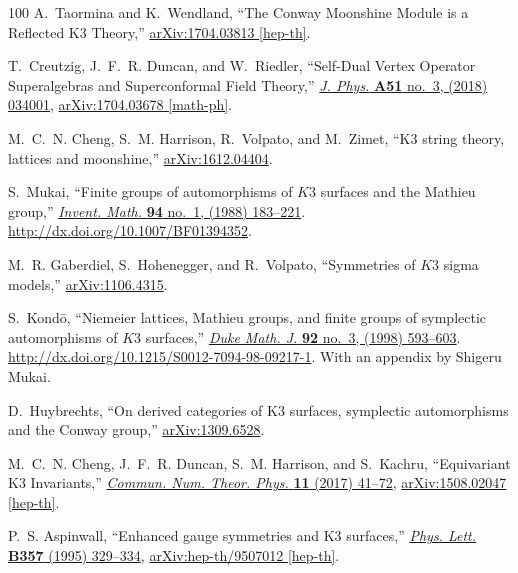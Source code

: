 \begin{thebibliography}{100}
A.~Taormina and K.~Wendland, ``{The Conway Moonshine Module is a Reflected K3
  Theory},''
\href{http://arxiv.org/abs/1704.03813}{{\ttfamily arXiv:1704.03813 [hep-th]}}.

T.~Creutzig, J.~F.~R. Duncan, and W.~Riedler, ``{Self-Dual Vertex Operator
  Superalgebras and Superconformal Field Theory},''
  \href{http://dx.doi.org/10.1088/1751-8121/aa9af5}{{\em J. Phys.} {\bfseries
  A51} no.~3, (2018) 034001},
\href{http://arxiv.org/abs/1704.03678}{{\ttfamily arXiv:1704.03678 [math-ph]}}.

M.~C.~N. Cheng, S.~M. Harrison, R.~Volpato, and M.~Zimet, ``K3 string theory,
  lattices and moonshine,''
  \href{http://arxiv.org/abs/arXiv:1612.04404}{{\ttfamily arXiv:1612.04404}}.

S.~Mukai, ``Finite groups of automorphisms of {$K3$} surfaces and the {M}athieu
  group,'' \href{http://dx.doi.org/10.1007/BF01394352}{{\em Invent. Math.}
  {\bfseries 94} no.~1, (1988) 183--221}.
  \url{http://dx.doi.org/10.1007/BF01394352}.

M.~R. Gaberdiel, S.~Hohenegger, and R.~Volpato, ``{Symmetries of $K3$ sigma
  models},'' \href{http://arxiv.org/abs/arXiv:1106.4315}{{\ttfamily
  arXiv:1106.4315}}.

S.~Kond{\=o}, ``Niemeier lattices, {M}athieu groups, and finite groups of
  symplectic automorphisms of {$K3$} surfaces,''
  \href{http://dx.doi.org/10.1215/S0012-7094-98-09217-1}{{\em Duke Math. J.}
  {\bfseries 92} no.~3, (1998) 593--603}.
  \url{http://dx.doi.org/10.1215/S0012-7094-98-09217-1}. With an appendix by
  Shigeru Mukai.

D.~Huybrechts, ``On derived categories of {K}3 surfaces, symplectic
  automorphisms and the {C}onway group,''
  \href{http://arxiv.org/abs/arXiv:1309.6528}{{\ttfamily arXiv:1309.6528}}.

M.~C.~N. Cheng, J.~F.~R. Duncan, S.~M. Harrison, and S.~Kachru, ``{Equivariant
  K3 Invariants},'' \href{http://dx.doi.org/10.4310/CNTP.2017.v11.n1.a2}{{\em
  Commun. Num. Theor. Phys.} {\bfseries 11} (2017) 41--72},
\href{http://arxiv.org/abs/1508.02047}{{\ttfamily arXiv:1508.02047 [hep-th]}}.

P.~S. Aspinwall, ``{Enhanced gauge symmetries and K3 surfaces},''
  \href{http://dx.doi.org/10.1016/0370-2693(95)00957-M}{{\em Phys. Lett.}
  {\bfseries B357} (1995) 329--334},
\href{http://arxiv.org/abs/hep-th/9507012}{{\ttfamily arXiv:hep-th/9507012
  [hep-th]}}.


\end{thebibliography}
